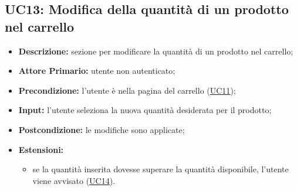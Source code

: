 
\subsection{UC13: Modifica della quantità di un prodotto nel carrello}
\label{sec:UC13}
\begin{itemize}
    \item \textbf{Descrizione:} sezione per modificare la quantità di un prodotto nel carrello;
    \item \textbf{Attore Primario:} utente non autenticato;
    \item \textbf{Precondizione:} l'utente è nella pagina del carrello (\hyperref[sec:UC11]{\underline{UC11}});
    \item \textbf{Input:} l'utente seleziona la nuova quantità desiderata per il prodotto;
    \item \textbf{Postcondizione:} le modifiche sono applicate;
    \item \textbf{Estensioni:}
          \begin{itemize}
              \item se la quantità inserita dovesse superare la quantità disponibile, l'utente viene avvisato (\hyperref[sec:UC14]{\underline{UC14}}).
          \end{itemize}
\end{itemize}